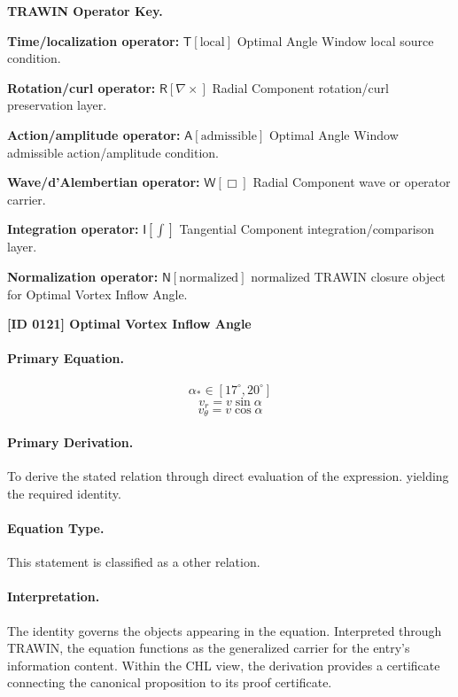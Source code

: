 \par\vspace{0.45\baselineskip}
\noindent\begin{minipage}[t]{\linewidth}
\begingroup
\small
\raggedright
\textbf{TRAWIN Operator Key.}\par
\noindent\textbf{Time/localization operator:} $\mathsf{T}\!\left[\mathrm{local}\right]$ Optimal Angle Window local source condition.\par
\noindent\textbf{Rotation/curl operator:} $\mathsf{R}\!\left[\nabla\times\right]$ Radial Component rotation/curl preservation layer.\par
\noindent\textbf{Action/amplitude operator:} $\mathsf{A}\!\left[\mathrm{admissible}\right]$ Optimal Angle Window admissible action/amplitude condition.\par
\noindent\textbf{Wave/d'Alembertian operator:} $\mathsf{W}\!\left[\Box\right]$ Radial Component wave or operator carrier.\par
\noindent\textbf{Integration operator:} $\mathsf{I}\!\left[\int\right]$ Tangential Component integration/comparison layer.\par
\noindent\textbf{Normalization operator:} $\mathsf{N}\!\left[\mathrm{normalized}\right]$ normalized TRAWIN closure object for Optimal Vortex Inflow Angle.\par
\endgroup
\end{minipage}

\clearpage
\noindent\textbf{[ID 0121] Optimal Vortex Inflow Angle}\par
\vspace{0.35em}
\paragraph{Primary Equation.}
\[
\alpha_{\ast} \in [17^{\circ},20^{\circ}]
\]
\[
v_r = v\sin\alpha
\]
\[
v_\theta = v\cos\alpha
\]

\paragraph{Primary Derivation.}
To derive the stated relation through direct evaluation of the expression. yielding the required identity.
\paragraph{Equation Type.}
This statement is classified as a other relation.

\paragraph{Interpretation.}
The identity governs the objects appearing in the equation. Interpreted through TRAWIN, the equation functions as the generalized carrier for the entry’s information content. Within the CHL view, the derivation provides a certificate connecting the canonical proposition to its proof certificate.

